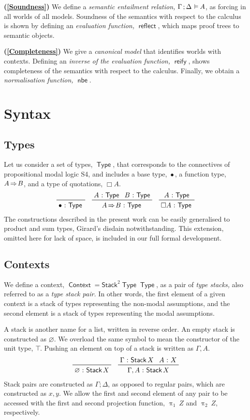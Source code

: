 \documentclass[submission,copyright,creativecommons,sharealike,backref=page]{eptcs}
\newcommand{\sA}{\mkern-2muA}
\renewcommand{\:}{\mathop{\mkern3mu:\mkern3mu}}
\renewcommand{\.}{\mathop{\mkern3mu.\mkern3mu}}
\renewcommand{\;}{\mathop{;}}
\renewcommand{\,}{\mathop{,}}
\newcommand{\ef}{\mathrel{\mkern2mu\vDash\mkern1mu}}
\newcommand{\rf}{\mathop{\Rightarrow\mkern-1mu}}
\newcommand{\reflect}{\operatorname{\textsf{reflect}}}
\newcommand{\reify}{\operatorname{\textsf{reify}}}
\newcommand{\nbe}{\operatorname{\textsf{nbe}}}
\newcommand{\pii}{\operatorname{\uppi_{\scriptscriptstyle{1}}}}
\newcommand{\piii}{\operatorname{\uppi_{\scriptscriptstyle{2}}}}
\newcommand{\Stack}{\operatorname{\textsf{Stack}}}
\newcommand{\StackII}{\operatorname{\textsf{Stack}^{\scriptscriptstyle{2}}}}
\newcommand{\Type}{\operatorname{\textsf{Type}}}
\newcommand{\Context}{\operatorname{\textsf{Context}}}
\newcommand{\base}{\mathop{\bullet}}
\renewcommand{\O}{\varnothing}
\theoremstyle{mystyle}
\begin{document}
\textbf{(\ref{Soundness})} We define a \emph{semantic entailment relation,} $\Gamma \; \Delta \ef \sA$, as forcing in all worlds of all models.  Soundness of the semantics with respect to the calculus is shown by defining an \emph{evaluation function,} $\reflect$, which maps proof trees to semantic objects.

\textbf{(\ref{Completeness})} We give a \emph{canonical model} that identifies worlds with contexts.  Defining an \emph{inverse of the evaluation function,} $\reify$, shows completeness of the semantics with respect to the calculus.  Finally, we obtain a \emph{normalisation function,} $\nbe$.


\section{Syntax}\label{Syntax}

\subsection{Types}
Let us consider a set of types, $\Type$, that corresponds to the connectives of propositional modal logic S4, and includes a base type, $\base$, a function type, $A \rf B$, and a type of quotations, $\Box A$.
\begin{align*}
  \prftree
    {}
    {\base \: \Type}
  \quad
  \prftree
    {A \: \Type}{B \: \Type}
    {A \rf B \: \Type}
  \quad
  \prftree
    {A \: \Type}
    {\Box A \: \Type}
\end{align*}
The constructions described in the present work can be easily generalised to product and sum types, Girard's disdain notwithstanding.  This extension, omitted here for lack of space, is included in our full formal development.


\subsection{Contexts}
We define a context, $\Context = \StackII \Type \Type$, as a pair of \emph{type stacks,} also referred to as a \emph{type stack pair.}  In other words, the first element of a given context is a stack of types representing the non-modal assumptions, and the second element is a stack of types representing the modal assumptions.

A stack is another name for a list, written in reverse order.  An empty stack is constructed as $\O$.  We overload the same symbol to mean the constructor of the unit type, $\top\mkern-3mu$.  Pushing an element on top of a stack is written as $\Gamma, A$.
\begin{align*}
  \prftree
    {}
    {\O \: \Stack X}
  \quad
  \prftree
    {\Gamma \: \Stack X}{A \: X}
    {\Gamma, A \: \Stack X}
\end{align*}
Stack pairs are constructed as $\Gamma \; \Delta$, as opposed to regular pairs, which are constructed as $x, y$.  We allow the first and second element of any pair to be accessed with the first and second projection function, $\pii~Z$ and $\piii~Z$, respectively.
\end{document}
